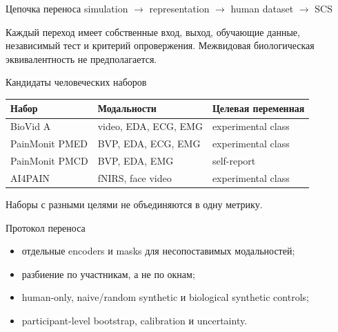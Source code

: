 \begin{frame}{Цепочка переноса}
\centering
\Large simulation $\rightarrow$ representation $\rightarrow$ human dataset $\rightarrow$ SCS
\vspace{0.5cm}
\small

Каждый переход имеет собственные вход, выход, обучающие данные, независимый тест и
критерий опровержения. Межвидовая биологическая эквивалентность не предполагается.
\end{frame}
\begin{frame}{Кандидаты человеческих наборов}
\small
\begin{tabular}{lll}
\toprule Набор & Модальности & Целевая переменная \\ \midrule
BioVid A & video, EDA, ECG, EMG & experimental class \\
PainMonit PMED & BVP, EDA, ECG, EMG & experimental class \\
PainMonit PMCD & BVP, EDA, EMG & self-report \\
AI4PAIN & fNIRS, face video & experimental class \\ \bottomrule
\end{tabular}
\vspace{0.3cm}

Наборы с разными целями не объединяются в одну метрику.
\end{frame}
\begin{frame}{Протокол переноса}
\begin{itemize}
  \item отдельные encoders и masks для несопоставимых модальностей;
  \item разбиение по участникам, а не по окнам;
  \item human-only, naive/random synthetic и biological synthetic controls;
  \item participant-level bootstrap, calibration и uncertainty.
\end{itemize}
\end{frame}

